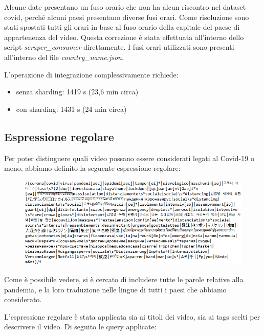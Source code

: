 \documentclass[10pt, a4paper,openany]{article}
\begin{document}
	Alcune date presentano un fuso orario che non ha alcun riscontro nel dataset covid, perché alcuni paesi presentano diverse fusi orari. Come risoluzione sono stati spostati tutti gli orari in base al fuso orario della capitale del paese di appartenenza del video. Questa correzione è stata effettuata all'interno dello script \textit{scraper\_consumer} direttamente. I fusi orari utilizzati sono presenti all'interno del file \textit{country\_name.json}.

	L'operazione di integrazione complessivamente richiede:
	\begin{itemize}
		\item senza sharding: 1419 s (23,6 min circa)
		\item con sharding: 1431 s (24 min circa)
	\end{itemize}

\subsection*{Espressione regolare}
	Per poter distinguere quali video possano essere considerati legati al Covid-19 o meno, abbiamo definito la seguente espressione regolare:
	\begin{figure}[H]
		\centering
		\includegraphics[width=0.95\linewidth]{pics/er.png}
	\end{figure}

	Come è possibile vedere, si è cercato di includere tutte le parole relative alla pandemia, e la loro traduzione nelle lingue di tutti i paesi che abbiamo considerato.
	
	L'espressione regolare è stata applicata sia ai titoli dei video, sia ai tags scelti per descrivere il video. Di seguito le query applicate:
	
\end{document}

